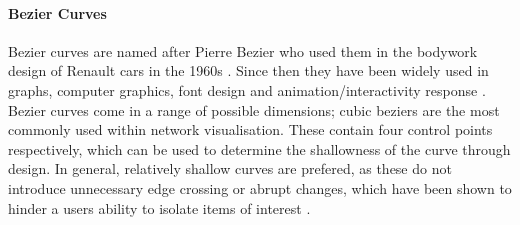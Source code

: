 \paragraph*{Bezier Curves}
Bezier curves are named after Pierre Bezier who used them in the bodywork design of Renault cars in the 1960s \citep{beziermath}. Since then they have been widely used in graphs, computer graphics, font design and animation/interactivity response \citep{bezier,beziermath,beziercomputer}. Bezier curves come in a range of possible dimensions; cubic beziers are the most commonly used within network visualisation. These contain four control points respectively, which can be used to determine the shallowness of the curve through design. In general, relatively shallow curves are prefered, as these do not introduce unnecessary edge crossing or abrupt changes, which have been shown to hinder a users ability to isolate items of interest \citep{ch6graphredability}.



